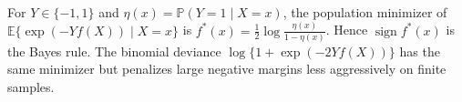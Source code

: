 \begin{remark} \label{rem:sl-exponential-loss-population-target} \\
For $Y\in\{-1,1\}$ and $\eta(x)=\mathbb{P}(Y=1\mid X=x)$, the population minimizer of $\mathbb{E}\{\exp(-Yf(X))\mid X=x\}$ is $f^*(x)=\frac12\log\frac{\eta(x)}{1-\eta(x)}$.  Hence $\operatorname{sign}f^*(x)$ is the Bayes rule.  The binomial deviance $\log\{1+\exp(-2Yf(X))\}$ has the same minimizer but penalizes large negative margins less aggressively on finite samples.
\end{remark}

